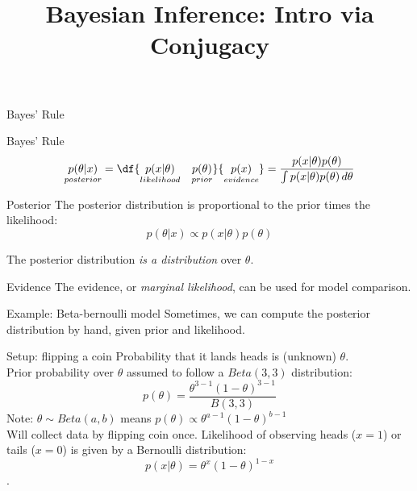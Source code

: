 \documentclass[10pt]{beamer}
\title{Bayesian Inference: Intro via Conjugacy}
\begin{document}
\maketitle






\begin{frame}{Bayes' Rule}
\footnotesize

\begin{sblock}{Bayes' Rule}
\[ \underset{posterior}{p(\theta|x)} = \df{ \underset{likelihood}{p(x|\theta)} \quad  \underset{prior}{p(\theta)} }{ \underset{evidence}{p(x)}}  = \dfrac{p(x | \theta) p(\theta)}{\int p(x | \theta) p(\theta) \, d\theta}  \]
\end{sblock}

\begin{sblock}{Posterior}
The posterior distribution is proportional to the prior times the likelihood:
\[p(\theta | x) \propto p(x | \theta) p(\theta)\]

The posterior distribution \textit{is a distribution} over $\theta$.

\end{sblock}

\begin{sblock}{Evidence}
The evidence, or \textit{marginal likelihood}, can be used for model comparison.
\end{sblock}

\end{frame}



\begin{frame}{Example: Beta-bernoulli model}
Sometimes, we can compute the posterior distribution by hand, given prior and likelihood.

\begin{sblock}{Setup: flipping a coin}
Probability that it lands heads is (unknown) $\theta$. \\
Prior probability over $\theta$ assumed to follow a $Beta(3,3)$ distribution:
$$ p(\theta) = \frac{\theta^{3-1}(1-\theta)^{3-1}}{B(3,3)}$$
Note: $\theta \sim Beta(a, b)$ means $p(\theta) \propto \theta^{a-1}(1-\theta)^{b-1}$\\
Will collect data by flipping coin once. Likelihood of observing heads ($x=1$) or tails ($x=0$) is given by a Bernoulli distribution:
$$p(x | \theta) = \theta^x(1-\theta)^{1-x} $$.
\end{sblock}


\end{frame}
\end{document}
